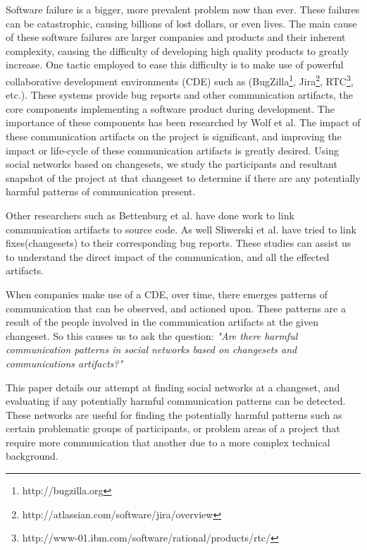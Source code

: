 \documentclass[conference]{IEEEtran}
\begin{document}
Software failure is a bigger, more prevalent problem now than ever.  These failures can be catastrophic, causing billions of lost dollars, or even lives.  The main cause of these software failures are larger companies and products and their inherent complexity, causing the difficulty of developing high quality products to greatly increase.  One tactic employed to ease this difficulty is to make use of powerful collaborative development environments (CDE) such as (BugZilla\footnote{http://bugzilla.org}, Jira\footnote{http://atlassian.com/software/jira/overview}, RTC\footnote{http://www-01.ibm.com/software/rational/products/rtc/}, etc.).  These systems provide bug reports and other communication artifacts, the core components implementing a software product during development.  The importance of these components has been researched by Wolf et al\cite{4721184}.  The impact of these communication artifacts on the project is significant, and improving the impact or life-cycle of these communication artifacts is greatly desired.  Using social networks based on changesets, we study the participants and resultant snapshot of the project at that changeset to determine if there are any potentially harmful patterns of communication present.  

Other researchers such as Bettenburg et al. have done work to link communication artifacts to source code\cite{Bettenburg:2008:ESI:1370750.1370757}.  As well Sliwerski et al. have tried to link fixes(changesets) to their corresponding bug reports\cite{Sliwerski:2005:CIF:1083142.1083147}.  These studies can assist us to understand the direct impact of the communication, and all the effected artifacts.  

When companies make use of a CDE, over time, there emerges patterns of communication that can be observed, and actioned upon.  These patterns are a result of the people involved in the communication artifacts at the given changeset.   So this causes us to ask the question: \textit{"Are there harmful communication patterns in social networks based on changesets and communications artifacts?"}  

This paper details our attempt at finding social networks at a changeset, and evaluating if any potentially harmful communication patterns can be detected.  These networks are useful for finding the potentially harmful patterns such as certain problematic groups of participants, or problem areas of a project that require more communication that another due to a more complex technical background.
\end{document}
